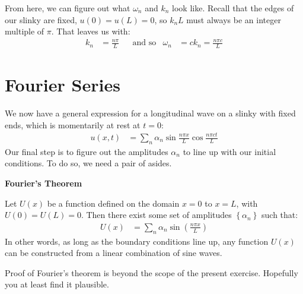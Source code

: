 \documentclass{article}
\renewenvironment{quote}{\begin{shaded*}\begin{oldquote}}{\end{oldquote}\end{shaded*}}
\begin{document}
From here, we can figure out what $\omega_n$ and $k_n$ look like. Recall that the edges of our slinky are fixed, ${u(0)=u(L)=0}$, so $k_n L$ must always be an integer multiple of $\pi$. That leaves us with:
\begin{align*}
    k_n &= \frac{n \pi}{L} &
    &\text{and so}&
    \omega_n &= ck_n = \frac{n \pi c}{L}
\end{align*}

\section*{Fourier Series}

We now have a general expression for a longitudinal wave on a slinky with fixed ends, which is momentarily at rest at $t=0$: 
\begin{align*}
    u(x, t) &=
    \displaystyle\sum_n \alpha_n \sin \tfrac{n \pi x}{L} \cos \tfrac{n \pi ct}{L}
\end{align*}
Our final step is to figure out the amplitudes $\alpha_n$ to line up with our initial conditions. To do so, we need a pair of asides. 

\begin{quote}
\textbf{Fourier's Theorem}

Let $U(x)$ be a function defined on the domain $x=0$ to $x=L$, with ${U(0)=U(L)=0}$. Then there exist some set of amplitudes $\left\{ \alpha_n \right\}$ such that:
\begin{align*}
    U(x) &= \displaystyle\sum_n \alpha_n \sin \left( \tfrac{n\pi x}{L} \right)
\end{align*}
In other words, as long as the boundary conditions line up, any function $U(x)$ can be constructed from a linear combination of sine waves.

Proof of Fourier's theorem is beyond the scope of the present exercise. Hopefully you at least find it plausible.
\end{quote}
\end{document}
